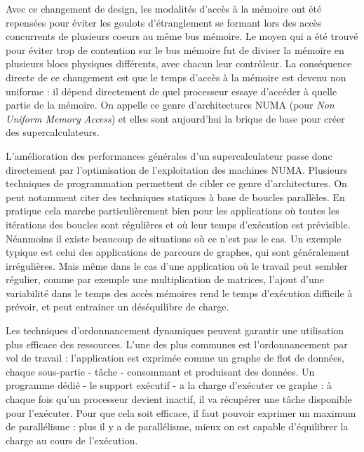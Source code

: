 Avec ce changement de design, les modalités d'accès à la mémoire ont été repensées pour éviter les goulots d'étranglement se formant lors des accès concurrents de plusieurs coeurs au même bus mémoire. Le moyen qui a été trouvé pour éviter trop de contention sur le bus mémoire fut de diviser la mémoire en plusieurs blocs physiques différents, avec chacun leur contrôleur.
La conséquence directe de ce changement est que le temps d'accès à la mémoire est devenu non uniforme : il dépend directement de quel processeur essaye d'accéder à quelle partie de la mémoire.
On appelle ce genre d'architectures NUMA (pour \emph{Non Uniform Memory Access}) et elles sont aujourd'hui la brique de base pour créer des supercalculateurs.

L'amélioration des performances générales d'un supercalculateur passe donc directement par l'optimisation de l'exploitation des machines NUMA.
Plusieurs techniques de programmation permettent de cibler ce genre d'architectures.
On peut notamment citer des techniques statiques à base de boucles parallèles.
En pratique cela marche particulièrement bien pour les applications où toutes les itérations des boucles sont régulières et où leur temps d'exécution est prévisible.
Néanmoins il existe beaucoup de situations où ce n'est pas le cas.
Un exemple typique est celui des applications de parcours de graphes, qui sont généralement irrégulières.
Mais même dans le cas d'une application où le travail peut sembler régulier, comme par exemple une multiplication de matrices, l'ajout d'une variabilité dans le temps des accès mémoires rend le temps d'exécution difficile à prévoir, et peut entrainer un déséquilibre de charge.


Les techniques d'ordonnancement dynamiques peuvent garantir une utilisation plus efficace des ressources.
L'une des plus communes est l'ordonnancement par vol de travail : l'application est exprimée comme un graphe de flot de données, chaque sous-partie - tâche - consommant et produisant des données.
Un programme dédié - le support exécutif - a la charge d'exécuter ce graphe : à chaque fois qu'un processeur devient inactif, il va récupérer une tâche disponible pour l'exécuter.
Pour que cela soit efficace, il faut pouvoir exprimer un maximum de parallélisme : plus il y a de parallélisme, mieux on est capable d'équilibrer la charge au cours de l'exécution.

